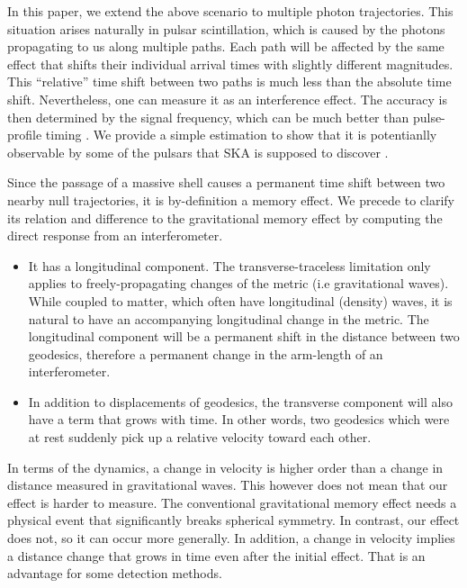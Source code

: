 \documentclass[aps,showpacs,onecolumn,floats,prd,superscriptaddress,nofootinbib]{revtex4-1}
\begin{document}
In this paper, we extend the above scenario to multiple photon trajectories.
This situation arises naturally in pulsar scintillation, which is caused by the photons propagating to us along multiple paths. 
Each path will be affected by the same effect that shifts their individual arrival times with slightly different magnitudes.
This ``relative'' time shift between two paths is much less than the absolute time shift. 
Nevertheless, one can measure it as an interference effect.
The accuracy is then determined by the signal frequency, which can be much better than pulse-profile timing \cite{PenYan14}.
We provide a simple estimation to show that it is potentianlly observable by some of the pulsars that SKA is supposed to discover \cite{MSPpopulation}. 

Since the passage of a massive shell causes a permanent time shift between two nearby null trajectories, it is by-definition a memory effect.
We precede to clarify its relation and difference to the gravitational memory effect \cite{Christodoulou_effect,GW_memory} by computing the direct response from an interferometer.


\begin{itemize}
\item It has a longitudinal component. The transverse-traceless limitation only applies to freely-propagating changes of the metric (i.e gravitational waves). 
While coupled to matter, which often have longitudinal (density) waves, it is natural to have an accompanying longitudinal change in the metric. 
The longitudinal component will be a permanent shift in the distance between two geodesics, therefore a permanent change in the arm-length of an interferometer.
\item In addition to displacements of geodesics, the transverse component will also have a term that grows with time. 
In other words, two geodesics which were at rest suddenly pick up a relative velocity toward each other.
\end{itemize}
In terms of the dynamics, a change in velocity is higher order than a change in distance measured in gravitational waves. 
This however does not mean that our effect is harder to measure. 
The conventional gravitational memory effect needs a physical event that significantly breaks spherical symmetry.  
In contrast, our effect does not, so it can occur more generally. 
In addition, a change in velocity implies a distance change that grows in time even after the initial effect. 
That is an advantage for some detection methods.  
\end{document}
